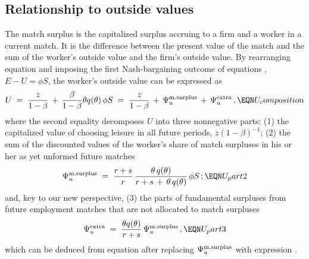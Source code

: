 \subsection{Relationship to outside values}
The match surplus is the
capitalized surplus accruing to a firm and a worker in a current match.  It is the
difference between the present value of the match and the sum of  the worker's outside value
and the  firm's outside
value. By rearranging equation  and imposing the first
Nash-bargaining outcome of equations , $E-U=\phi S$,
the worker's outside value can be expressed as
$$
U \;=\; \frac{z}{1-\beta} \,+\, \frac{\beta}{1-\beta}
\theta q(\theta)\,\phi S
\;=\; \frac{z}{1-\beta}\,+\,\Psi^{\rm m.surplus}_u
                             \,+\,\Psi^{\rm extra}_u\,,
                                                    \EQN U_composition
$$
where the second equality decomposes $U$ into three nonnegative parts: (1) the
capitalized value of choosing leisure in all future periods,
$z(1-\beta)^{-1}$; (2)  the sum %
of the discounted values of the worker's share of match
surpluses in his or her as yet unformed future
matches
$$
\Psi^{\rm m.surplus}_u \;=\;
\frac{r+s}{r} \, \frac{\theta\,q(\theta)}{r+s\,+\,\theta\,q(\theta)}
\, \phi S\,;
                                                 \EQN U_part2
$$
 and, key to our new perspective, (3)
the  parts %
of fundamental surpluses
from future employment matches that are not allocated to match
surpluses
$$
\Psi^{\rm extra}_u \;=\; \frac{\theta q(\theta)}{r+s}
\, \Psi^{\rm m.surplus}_u \,,
                                                  \EQN U_part3
$$
which can be deduced from equation 
after replacing $\Psi^{\rm m.surplus}_u$ with
expression .

